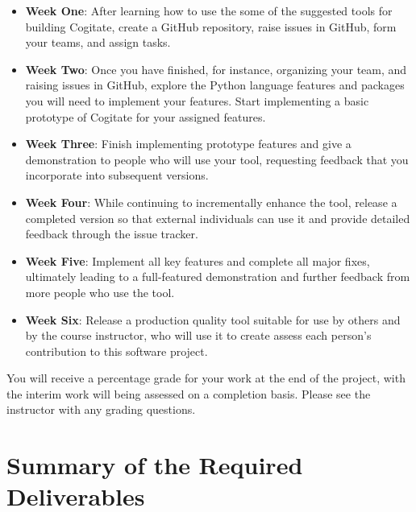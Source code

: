\documentclass[11pt]{article}
\begin{document}
\begin{itemize}

  \setlength{\itemsep}{0pt}

  \item {\bf Week One}: After learning how to use the some of the suggested
    tools for building Cogitate, create a GitHub repository, raise issues in
    GitHub, form your teams, and assign tasks.

  \item {\bf Week Two}: Once you have finished, for instance, organizing your
    team, and raising issues in GitHub, explore the Python language features and
    packages you will need to implement your features. Start implementing a
    basic prototype of Cogitate for your assigned features.

  \item {\bf Week Three}: Finish implementing prototype features and give a
    demonstration to people who will use your tool, requesting feedback that you
    incorporate into subsequent versions.

  \item {\bf Week Four}: While continuing to incrementally enhance the tool,
    release a completed version so that external individuals can use it and
    provide detailed feedback through the issue tracker.

  \item {\bf Week Five}: Implement all key features and complete all major
    fixes, ultimately leading to a full-featured demonstration and further
    feedback from more people who use the tool.

  \item {\bf Week Six}: Release a production quality tool suitable for use by
    others and by the course instructor, who will use it to create assess each
    person's contribution to this software project.

\end{itemize}

\vspace*{-.25em}

\noindent You will receive a percentage grade for your work at the end of the
project, with the interim work will being assessed on a completion basis.
Please see the instructor with any grading questions.

\section*{Summary of the Required Deliverables}
\end{document}
